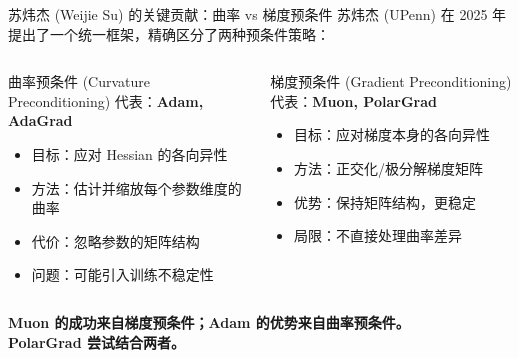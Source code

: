 \documentclass[aspectratio=169,10pt]{ctexbeamer}
\begin{document}
\begin{frame}{苏炜杰 (Weijie Su) 的关键贡献：曲率 vs 梯度预条件}
苏炜杰 (UPenn) 在 2025 年提出了一个统一框架，精确区分了两种预条件策略：

\vspace{0.2cm}
\begin{columns}[T]
\begin{block}{曲率预条件 (Curvature Preconditioning)}
  代表：\textbf{Adam, AdaGrad}
  \begin{itemize}
    \item 目标：应对 Hessian 的各向异性
    \item 方法：估计并缩放每个参数维度的曲率
    \item 代价：忽略参数的矩阵结构
    \item 问题：可能引入训练不稳定性
  \end{itemize}
\end{block}

\begin{block}{梯度预条件 (Gradient Preconditioning)}
  代表：\textbf{Muon, PolarGrad}
  \begin{itemize}
    \item 目标：应对梯度本身的各向异性
    \item 方法：正交化/极分解梯度矩阵
    \item 优势：保持矩阵结构，更稳定
    \item 局限：不直接处理曲率差异
  \end{itemize}
\end{block}
\end{columns}

\vspace{0.2cm}
\begin{center}
\textbf{Muon 的成功来自梯度预条件；Adam 的优势来自曲率预条件。}\\
\textbf{PolarGrad 尝试结合两者。}
\end{center}
\end{frame}
\end{document}
